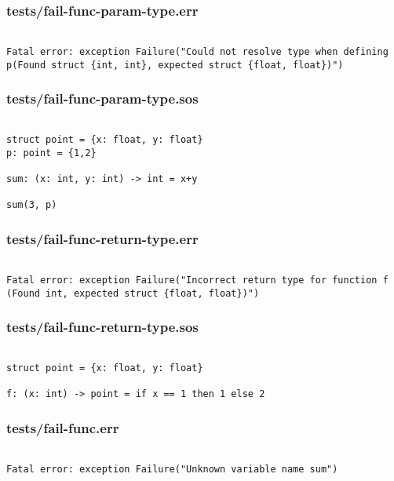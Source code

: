 \documentclass[main.tex]{subfiles}
\begin{document}
\subsubsection{tests/fail-func-param-type.err}

\begin{lstlisting}

Fatal error: exception Failure("Could not resolve type when defining p(Found struct {int, int}, expected struct {float, float})")
\end{lstlisting}

\subsubsection{tests/fail-func-param-type.sos}

\begin{lstlisting}

struct point = {x: float, y: float}
p: point = {1,2}

sum: (x: int, y: int) -> int = x+y

sum(3, p)
\end{lstlisting}

\subsubsection{tests/fail-func-return-type.err}

\begin{lstlisting}

Fatal error: exception Failure("Incorrect return type for function f (Found int, expected struct {float, float})")
\end{lstlisting}

\subsubsection{tests/fail-func-return-type.sos}

\begin{lstlisting}

struct point = {x: float, y: float}

f: (x: int) -> point = if x == 1 then 1 else 2
\end{lstlisting}

\subsubsection{tests/fail-func.err}

\begin{lstlisting}

Fatal error: exception Failure("Unknown variable name sum")
\end{lstlisting}
\end{document}
